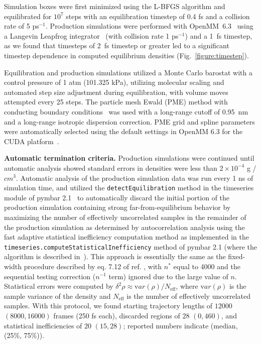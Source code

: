 \documentclass[aip, jcp, reprint]{revtex4-1}  %
\newcommand{\var}[1]{{\mathrm var}{(#1)}}
\begin{document}
Simulation boxes were first minimized using the L-BFGS algorithm \cite{liu1989limited} and equilibrated for $10^7$ steps with an equilibration timestep of 0.4 fs and a collision rate of 5 ps$^{-1}$.  
Production simulations were performed with OpenMM~6.3~\cite{eastman2012openmm} using a Langevin Leapfrog integrator~\cite{izaguirre-sweet-pande:psb:2010:langevin-leapfrog} (with collision rate 1 ps$^{-1}$) and a 1~fs timestep, as we found that timesteps of 2~fs timestep or greater led to a significant timestep dependence in computed equilibrium densities (Fig.~\ref{figure:timestep}).  

Equilibration and production simulations utilized a Monte Carlo barostat with a control pressure of 1 atm (101.325 kPa), utilizing molecular scaling and automated step size adjustment during equilibration, with volume moves attempted every 25 steps.  
The particle mesh Ewald (PME) method with conducting boundary conditions~\cite{Darden1993} was used with a long-range cutoff of 0.95~nm and a long-range isotropic dispersion correction. 
PME grid and spline parameters were automatically selected using the default settings in OpenMM 6.3 for the CUDA platform~\cite{eastman2012openmm}.

{\bf Automatic termination criteria.}
Production simulations were continued until automatic analysis showed standard errors in densities were less than $2 \times 10^{-4}$ g / $cm^{3}$.
Automatic analysis of the production simulation data was run every 1 ns of simulation time, and utilized the {\tt detectEquilibration} method in the timeseries module of pymbar 2.1~\cite{shirts2008statistically} to automatically discard the initial portion of the production simulation containing strong far-from-equilibrium behavior by maximizing the number of effectively uncorrelated samples in the remainder of the production simulation as determined by autocorrelation analysis using the fast adaptive statistical inefficiency computation method as implemented in the {\tt timeseries.computeStatisticalInefficiency} method of pymbar 2.1 (where the algorithm is described in~\cite{chodera2007}).
This approach is essentially the same as the fixed-width procedure described by eq. 7.12 of ref. \cite{brooks2011handbook}, with $n^*$ equal to 4000 and the sequential testing correction ($n^{-1}$ term) ignored due to the large value of $n$.
Statistical errors were computed by $\delta^2 \rho \approx \var{\rho} / N_\mathrm{eff}$, where $\var{\rho}$ is the sample variance of the density and $N_\mathrm{eff}$ is the number of effectively uncorrelated samples.  
With this protocol, we found starting trajectory lengths of $12000$ $(8000, 16000)$ frames (250 fs each), discarded regions of $28$  $(0, 460)$, and statistical inefficiencies of $20$ $(15, 28)$; reported numbers indicate (median, (25\%, 75\%)).  
\end{document}
